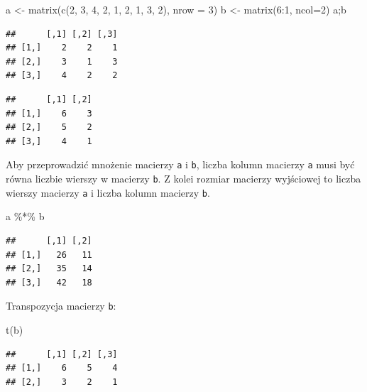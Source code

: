 \documentclass[
]{book}
\newenvironment{Shaded}{\begin{snugshade}}{\end{snugshade}}
\newcommand{\AttributeTok}[1]{\textcolor[rgb]{0.77,0.63,0.00}{#1}}
\newcommand{\DecValTok}[1]{\textcolor[rgb]{0.00,0.00,0.81}{#1}}
\newcommand{\FunctionTok}[1]{\textcolor[rgb]{0.00,0.00,0.00}{#1}}
\newcommand{\NormalTok}[1]{#1}
\newcommand{\OtherTok}[1]{\textcolor[rgb]{0.56,0.35,0.01}{#1}}
\newcommand{\SpecialCharTok}[1]{\textcolor[rgb]{0.00,0.00,0.00}{#1}}
\begin{document}
\begin{Shaded}
\begin{Highlighting}[]
\NormalTok{a }\OtherTok{\textless{}{-}} \FunctionTok{matrix}\NormalTok{(}\FunctionTok{c}\NormalTok{(}\DecValTok{2}\NormalTok{, }\DecValTok{3}\NormalTok{, }\DecValTok{4}\NormalTok{, }\DecValTok{2}\NormalTok{, }\DecValTok{1}\NormalTok{, }\DecValTok{2}\NormalTok{, }\DecValTok{1}\NormalTok{, }\DecValTok{3}\NormalTok{, }\DecValTok{2}\NormalTok{), }\AttributeTok{nrow =} \DecValTok{3}\NormalTok{)}
\NormalTok{b }\OtherTok{\textless{}{-}} \FunctionTok{matrix}\NormalTok{(}\DecValTok{6}\SpecialCharTok{:}\DecValTok{1}\NormalTok{, }\AttributeTok{ncol=}\DecValTok{2}\NormalTok{)}
\NormalTok{a;b}
\end{Highlighting}
\end{Shaded}

\begin{verbatim}
##      [,1] [,2] [,3]
## [1,]    2    2    1
## [2,]    3    1    3
## [3,]    4    2    2
\end{verbatim}

\begin{verbatim}
##      [,1] [,2]
## [1,]    6    3
## [2,]    5    2
## [3,]    4    1
\end{verbatim}

Aby przeprowadzić mnożenie macierzy \texttt{a} i \texttt{b}, liczba kolumn macierzy \texttt{a} musi być równa liczbie wierszy w macierzy \texttt{b}. Z kolei rozmiar macierzy wyjściowej to liczba wierszy macierzy \texttt{a} i liczba kolumn macierzy \texttt{b}.

\begin{Shaded}
\begin{Highlighting}[]
\NormalTok{a }\SpecialCharTok{\%*\%}\NormalTok{ b}
\end{Highlighting}
\end{Shaded}

\begin{verbatim}
##      [,1] [,2]
## [1,]   26   11
## [2,]   35   14
## [3,]   42   18
\end{verbatim}

Transpozycja macierzy \texttt{b}:

\begin{Shaded}
\begin{Highlighting}[]
\FunctionTok{t}\NormalTok{(b)}
\end{Highlighting}
\end{Shaded}

\begin{verbatim}
##      [,1] [,2] [,3]
## [1,]    6    5    4
## [2,]    3    2    1
\end{verbatim}
\end{document}

